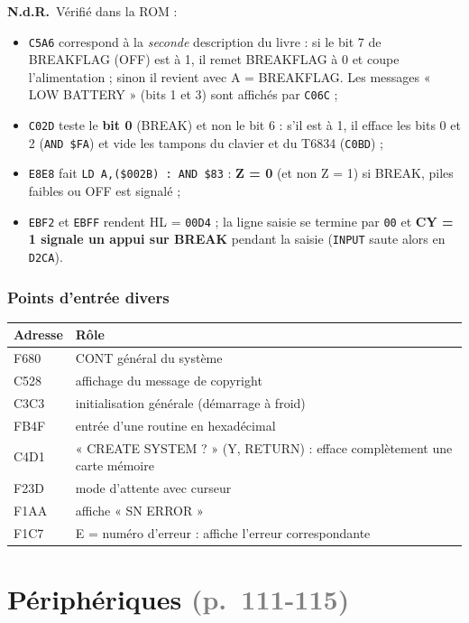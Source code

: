 \documentclass[a4paper,10pt]{article}
\newcommand{\hex}[1]{\texttt{#1}}
\newcommand{\pg}[1]{\texorpdfstring{\textcolor{gray}{\small(p.~#1)}}{}}
\newcommand{\nota}[1]{\textcolor{red!60!black}{\small\textbf{N.d.R.}~#1}}
\begin{document}
\nota{Vérifié dans la ROM :
\begin{itemize}
  \item \hex{C5A6} correspond à la \emph{seconde} description du livre : si le
        bit 7 de BREAKFLAG (OFF) est à 1, il remet BREAKFLAG à 0 et coupe
        l'alimentation ; sinon il revient avec A = BREAKFLAG. Les messages
        « LOW BATTERY » (bits 1 et 3) sont affichés par \hex{C06C} ;
  \item \hex{C02D} teste le \textbf{bit 0} (BREAK) et non le bit 6 : s'il est
        à 1, il efface les bits 0 et 2 (\texttt{AND \$FA}) et vide les tampons
        du clavier et du T6834 (\hex{C0BD}) ;
  \item \hex{E8E8} fait \texttt{LD A,(\$002B) : AND \$83} : \textbf{Z = 0}
        (et non Z = 1) si BREAK, piles faibles ou OFF est signalé ;
  \item \hex{EBF2} et \hex{EBFF} rendent HL = \hex{00D4} ; la ligne saisie
        se termine par \hex{00} et \textbf{CY = 1 signale un appui sur BREAK}
        pendant la saisie (\texttt{INPUT} saute alors en \hex{D2CA}).
\end{itemize}}

\subsubsection*{Points d'entrée divers}
\begin{center}\small
\begin{tabular}{@{}>{\ttfamily}ll@{}}
\toprule
\normalfont Adresse & Rôle \\
\midrule
F680 & CONT général du système \\
C528 & affichage du message de copyright \\
C3C3 & initialisation générale (démarrage à froid) \\
FB4F & entrée d'une routine en hexadécimal \\
C4D1 & « CREATE SYSTEM ? » (Y, RETURN) : efface complètement une carte mémoire \\
F23D & mode d'attente avec curseur \\
F1AA & affiche « SN ERROR » \\
F1C7 & E = numéro d'erreur : affiche l'erreur correspondante \\
\bottomrule
\end{tabular}
\end{center}

\section{Périphériques \pg{111-115}}
\end{document}
